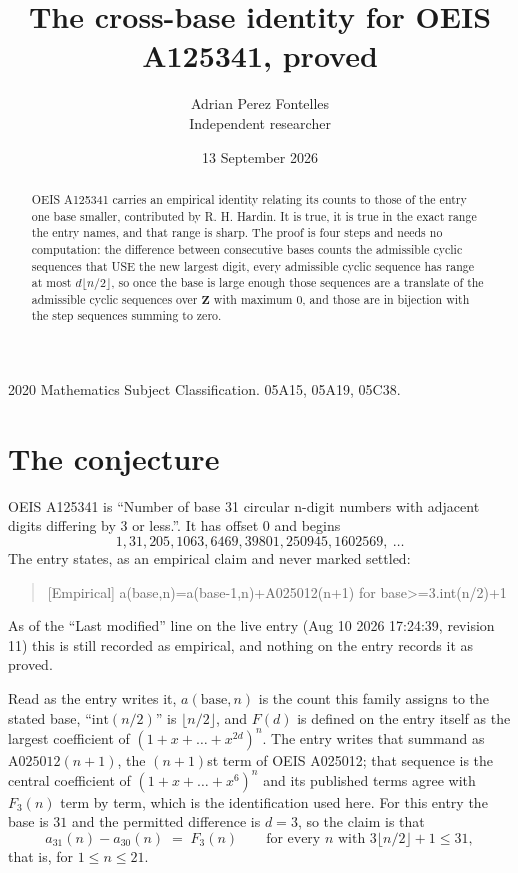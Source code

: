 \documentclass[11pt,a4paper]{article}
\title{The cross-base identity for OEIS A125341, proved}
\author{Adrian Perez Fontelles\\ \small Independent researcher}
\date{13 September 2026}
\theoremstyle{plain}
\theoremstyle{definition}
\begin{document}
\maketitle

\begin{abstract}
OEIS A125341 carries an empirical identity relating its counts to those of the entry one base
smaller, contributed by R. H. Hardin. It is true, it is true in the exact range the entry
names, and that range is sharp. The proof is four steps and needs no computation: the
difference between consecutive bases counts the admissible cyclic sequences that USE the new
largest digit, every admissible cyclic sequence has range at most $d\lfloor n/2\rfloor$, so
once the base is large enough those sequences are a translate of the admissible cyclic
sequences over $\mathbf{Z}$ with maximum $0$, and those are in bijection with the step
sequences summing to zero.
\end{abstract}

\noindent\small 2020 Mathematics Subject Classification. 05A15, 05A19, 05C38.\normalsize

\section{The conjecture}

OEIS A125341 is ``Number of base 31 circular n-digit numbers with adjacent digits differing by 3 or less.''. It has offset $0$ and begins
\[
1, 31, 205, 1063, 6469, 39801, 250945, 1602569,\ \dots
\]
The entry states, as an empirical claim and never marked settled:
\begin{quote}
[Empirical] a(base,n)=a(base-1,n)+A025012(n+1) for base>=3.int(n/2)+1
\end{quote}
As of the ``Last modified'' line on the live entry (Aug 10 2026 17:24:39, revision 11)
this is still recorded as empirical, and nothing on the entry records it as proved.

Read as the entry writes it, $a(\mathrm{base},n)$ is the count this family assigns to the
stated base, ``$\mathrm{int}(n/2)$'' is $\lfloor n/2\rfloor$, and $F(d)$ is defined on the
entry itself as the largest coefficient of $(1+x+\dots+x^{2d})^{n}$. The entry writes that summand as $\mathrm{A025012}(n+1)$, the $(n+1)$st term of OEIS A025012; that sequence is the central coefficient of $(1+x+\dots+x^{6})^{n}$ and its published terms agree with $F_{3}(n)$ term by term, which is the identification used here. For this entry
the base is $31$ and the permitted difference is $d=3$, so the claim is that
\[
a_{31}(n)-a_{30}(n)\;=\;F_{3}(n)
\qquad\text{for every } n \text{ with } 3\lfloor n/2\rfloor+1\le31,
\]
that is, for $1\le n\le21$.
\end{document}
